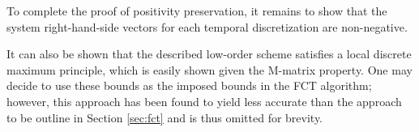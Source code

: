 To complete the proof of positivity preservation, it remains to show that
the system right-hand-side vectors for each temporal discretization are
non-negative.


It can also be shown that the described low-order scheme satisfies a local
discrete maximum principle, which is easily shown given the M-matrix property.
One may decide to use these bounds as the imposed bounds in the FCT
algorithm; however, this approach has been found to yield less accurate
than the approach to be outline in Section \ref{sec:fct} and is thus omitted
for brevity.
